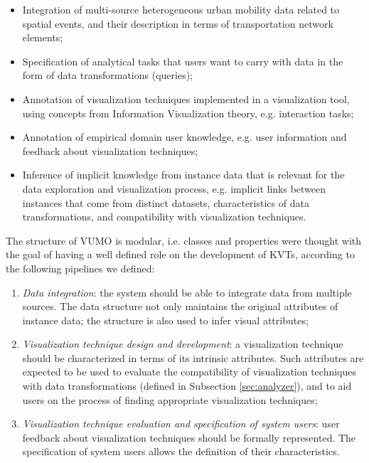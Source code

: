 \documentclass[]{interact}
\theoremstyle{plain}%
\theoremstyle{definition}
\theoremstyle{remark}
\theoremstyle{definition}
\begin{document}
\begin{itemize}
	\item Integration of multi-source heterogeneous urban mobility data related to spatial events, and their description in terms of transportation network elements;
	\item Specification of analytical tasks that users want to carry with data in the form of data transformations (queries);
	\item Annotation of visualization techniques implemented in a visualization tool, using concepts from Information Visualization theory, e.g. interaction tasks;
	\item Annotation of empirical domain user knowledge, e.g. user information and feedback about visualization techniques;
	\item Inference of implicit knowledge from instance data that is relevant for the data exploration and visualization process, e.g. implicit links between instances that come from distinct datasets, characteristics of data transformations, and compatibility with visualization techniques.
\end{itemize}

The structure of VUMO is modular, i.e. classes and properties were thought with the goal of having a well defined role on the development of KVTs, according to the following pipelines we defined:

\begin{enumerate}
	\item \emph{Data integration}: the system should be able to integrate data from multiple sources. The data structure not only maintains the original attributes of instance data; the structure is also used to infer visual attributes;
	\item \emph{Visualization technique design and development}: a visualization technique should be characterized in terms of its intrinsic attributes. Such attributes are expected to be used to evaluate the compatibility of visualization techniques with data transformations (defined in Subsection \ref{sec:analyzer}), and to aid users on the process of finding appropriate visualization techniques;
	\item \emph{Visualization technique evaluation and specification of system users}: user feedback about visualization techniques should be formally represented. The specification of system users allows the definition of their characteristics.
\end{enumerate}

\end{document}
